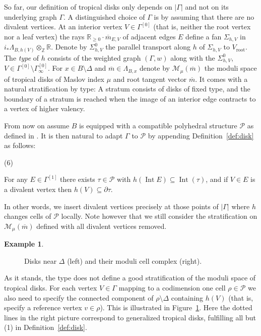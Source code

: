 \documentclass[11pt,letter]{amsart}
\theoremstyle{definition}
\newtheorem{example}[theorem]{Example}
\theoremstyle{remark}
\numberwithin{equation}{section}
\numberwithin{figure}{section}
\newcommand{\ZZ} {\mathbb{Z}}
\newcommand{\RR} {\mathbb{R}}
\newcommand {\Int}  {\operatorname{Int}}
\newcommand {\M} {\mathcal{M}}
\renewcommand{\P}  {\mathscr{P}}
\newcommand {\rootvertex}  {V_{\mathrm{root}}}
\begin{document}
So far, our definition of tropical disks only depends on $|\Gamma|$ and not on
its underlying graph $\Gamma$. A distinguished choice of $\Gamma$ is by assuming
that there are no divalent vertices. At an interior vertex $V\in\Gamma^{[0]}$
(that is, neither the root vertex nor a leaf vertex) the rays $\RR_{\ge 0}\cdot
\overline m_{E,V}$ of adjacent edges $E$ define a fan $\Sigma_{h,V}$ in
$i_*\Lambda_{B,h(V)} \otimes_\ZZ\RR$. Denote by $\Sigma_{h,V}^0$ the parallel
transport along $h$ of $\Sigma_{h,V}$ to $\rootvertex$. The \emph{type} of $h$
consists of the weighted graph $(\Gamma,w)$ along with the $\Sigma_{h,V}^0$, $V
\in \Gamma^{[0]}\setminus \Gamma^{[0]}_\infty$. For $x\in B\setminus \Delta$ and
$\overline m\in \Lambda_{B,x}$ denote by $\M_\mu(\overline m)$ the moduli space
of tropical disks of Maslov index $\mu$ and root tangent vector $\overline m$.
It comes with a natural stratification by type: A stratum consists of disks of
fixed type, and the boundary of a stratum is reached when the image of an
interior edge contracts to a vertex of higher valency.
\smallskip

From now on assume $B$ is equipped with a compatible polyhedral structure $\P$
as defined in \cite[\S1.3]{logmirror}. It is then natural to adapt $\Gamma$ to
$\P$ by appending Definition~\ref{def:disk} as follows:
\begin{list}{(6)}
\item
For any $E\in\Gamma^{[1]}$ there exists $\tau\in \P$ with $h(\Int E)\subseteq
\Int(\tau)$, and if $V\in E$ is a divalent vertex then
$h(V)\subseteq\partial\tau$.
\end{list}
\noindent 
In other words, we insert divalent vertices precisely at those points of
$|\Gamma|$ where $h$ changes cells of $\P$ locally. Note however that we still
consider the stratification on $\M_\mu(\overline m)$ defined with all divalent
vertices removed.

\begin{example}
\begin{figure}[h]

\caption{Disks near $\Delta$ (left) and their moduli cell complex (right).}
\label{fig:cells}
\end{figure}
As it stands, the type does not define a good stratification of the moduli space
of tropical disks. For each vertex $V\in\Gamma$ mapping to a codimension one
cell $\rho\in\P$ we also need to specify the connected component of $\rho
\setminus \Delta$ containing $h(V)$ (that is, specify a reference vertex
$v\in\rho$). This is illustrated in Figure~\ref{fig:cells}. Here the dotted
lines in the right picture correspond to generalized tropical disks, fulfilling
all but (1) in Definition~\ref{def:disk}.
\end{example}
\end{document}
